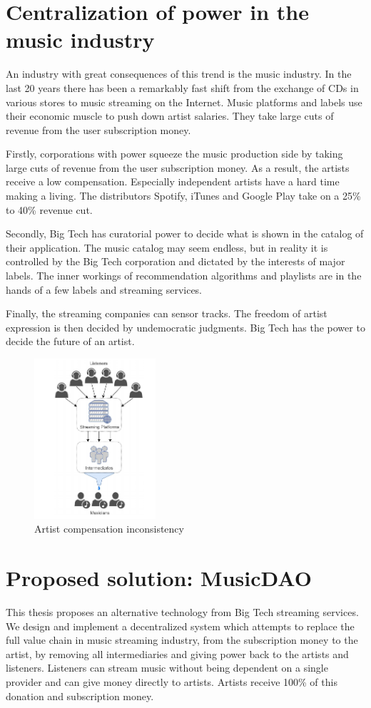 \section{Centralization of power in the music industry}
An industry with great consequences of this trend is the music industry. In the last 20 years there has been a remarkably fast shift from the exchange of CDs in various stores to music streaming on the Internet. Music platforms and labels use their economic muscle to push down artist salaries. They take large cuts of revenue from the user subscription money.

Firstly, corporations with power squeeze the music production side by taking large cuts of revenue from the user subscription money. As a result, the artists receive a low compensation. Especially independent artists have a hard time making a living. The distributors Spotify, iTunes and Google Play take on a 25\% to 40\% revenue cut.

Secondly, Big Tech has curatorial power to decide what is shown in the catalog of their application. The music catalog may seem endless, but in reality it is controlled by the Big Tech corporation and dictated by the interests of major labels. The inner workings of recommendation algorithms and playlists are in the hands of a few labels and streaming services.

Finally, the streaming companies can sensor tracks. The freedom of artist expression is then decided by undemocratic judgments. Big Tech has the power to decide the future of an artist.

\begin{figure}
	\includegraphics[width=0.4\textwidth]{introduction/problem-image.png}
	\caption{Artist compensation inconsistency}
\end{figure}

\section{Proposed solution: MusicDAO}
This thesis proposes an alternative technology from Big Tech streaming services. We design and implement a decentralized system which attempts to replace the full value chain in music streaming industry, from the subscription money to the artist, by removing all intermediaries and giving power back to the artists and listeners. Listeners can stream music without being dependent on a single provider and can give money directly to artists. Artists receive 100\% of this donation and subscription money.

